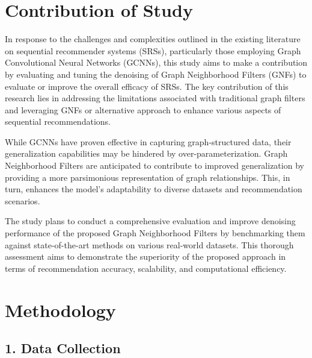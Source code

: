 \documentclass[journal]{IEEEtran}
\begin{document}

\section{Contribution of Study}

In response to the challenges and complexities outlined in the existing literature on sequential recommender systems (SRSs), 
particularly those employing Graph Convolutional Neural Networks (GCNNs), this study aims to make a contribution by 
evaluating and tuning the denoising of Graph Neighborhood Filters (GNFs) \cite{tenorio2021robust} \cite{FENG2022113} to evaluate or 
improve the overall efficacy of SRSs. The key contribution of this research lies in addressing the limitations associated with traditional 
graph filters and leveraging GNFs or alternative approach to enhance various aspects of sequential recommendations.

While GCNNs have proven effective in capturing graph-structured data, their generalization capabilities may be hindered by 
over-parameterization. Graph Neighborhood Filters are anticipated to contribute to improved generalization by providing a more 
parsimonious representation of graph relationships. This, in turn, enhances the model's adaptability to diverse datasets and 
recommendation scenarios.

The study plans to conduct a comprehensive evaluation and improve denoising performance of the proposed Graph Neighborhood 
Filters by benchmarking them against state-of-the-art methods on various real-world datasets. This thorough assessment aims 
to demonstrate the superiority of the proposed approach in terms of recommendation accuracy, scalability, and computational efficiency.




\section{Methodology}

\subsection*{1. Data Collection}
\end{document}
